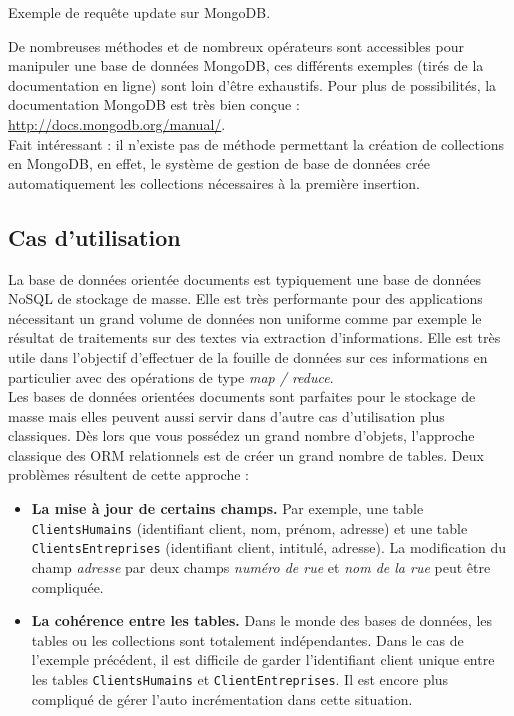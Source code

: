 	\begin{listing}[H]
		\inputminted{javascript}{code/requeteMongoUpdate.js}
		\caption{Exemple de requête update sur MongoDB.}
		\label{updateMongoDB}
	\end{listing}

	De nombreuses méthodes et de nombreux opérateurs sont accessibles pour manipuler une base de données MongoDB, ces différents exemples (tirés de la documentation en ligne) sont loin d'être exhaustifs. Pour plus de possibilités, la documentation MongoDB est très bien conçue : \url{http://docs.mongodb.org/manual/}.\\

	Fait intéressant : il n'existe pas de méthode permettant la création de collections en MongoDB, en effet, le système de gestion de base de données crée automatiquement les collections nécessaires à la première insertion.

\subsection{Cas d'utilisation}

	La base de données orientée documents est typiquement une base de données NoSQL de stockage de masse. Elle est très performante pour des applications nécessitant un grand volume de données non uniforme comme par exemple le résultat de traitements sur des textes via extraction d'informations. Elle est très utile dans l'objectif d'effectuer de la fouille de données sur ces informations en particulier avec des opérations de type \textit{map / reduce}.\\

	Les bases de données orientées documents sont parfaites pour le stockage de masse mais elles peuvent aussi servir dans d'autre cas d'utilisation plus classiques. Dès lors que vous possédez un grand nombre d'objets, l'approche classique des ORM relationnels est de créer un grand nombre de tables. Deux problèmes résultent de cette approche : \\
	\begin{itemize}
		\item \textbf{La mise à jour de certains champs.} Par exemple, une table \texttt{ClientsHumains} (identifiant client, nom, prénom, adresse) et une table \texttt{ClientsEntreprises} (identifiant client, intitulé, adresse). La modification du champ \textit{adresse} par deux champs \textit{numéro de rue} et \textit{nom de la rue} peut être compliquée.
		\item \textbf{La cohérence entre les tables.} Dans le monde des bases de données, les tables ou les collections sont totalement indépendantes. Dans le cas de l'exemple précédent, il est difficile de garder l'identifiant client unique entre les tables \texttt{ClientsHumains} et \texttt{ClientEntreprises}. Il est encore plus compliqué de gérer l'auto incrémentation dans cette situation.
	\end{itemize}

